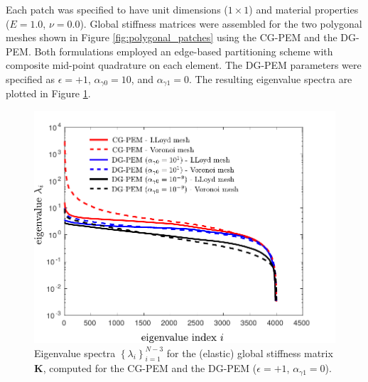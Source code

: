 Each patch was specified to have unit dimensions ($1 \times 1$) and material properties ($E = 1.0$, $\nu = 0.0$). Global stiffness matrices were assembled for the two polygonal meshes shown in Figure \ref{fig:polygonal_patches} using the CG-PEM and the DG-PEM. Both formulations employed an edge-based partitioning scheme with composite mid-point quadrature on each element. The DG-PEM parameters were specified as $\epsilon = +1$, $\alpha_{\gamma0} = 10$, and $\alpha_{\gamma1} = 0$. The resulting eigenvalue spectra are plotted in Figure \ref{fig:patch_eigenvalue_distributions}.

\begin{figure}[!h]
  \centering
  \includegraphics[width=5.0in]{figures/eigenvalue_distributions.pdf}  \caption{Eigenvalue spectra $\left\{ \lambda_i \right\}_{i = 1}^{N-3}$ for the (elastic) global stiffness matrix $\mathbf{K}$, computed for the CG-PEM and the DG-PEM ($\epsilon = +1$, $\alpha_{\gamma1} = 0$).}
  \label{fig:patch_eigenvalue_distributions}
\end{figure}

